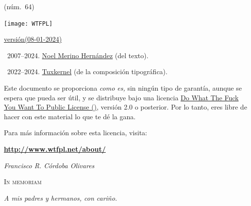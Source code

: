 \documentclass[14pt,twoside,final]{extbook} %
\providecommand\phantomsection{} %
\begin{document}
\begin{center}
(núm.\ 64)
\end{center}
\newpage
\pagestyle{empty}
\protect\phantomsection
{}
\vspace*{0pt}
\vfill
\begin{scriptsize}
\begin{flushleft}
\begin{minipage}{7.5cm}
\texttt{[image: WTFPL]}\phantomsection\label{fig:wtfpl} \protect\medskip

\def\fileversion{1.041}
\def\filedate{(08-01-2024)}
\href{https://tuxkernel.github.io/tx/dl/cv.txt}{versión\space\fileversion\space\filedate} \protect\medskip

\textcopyright\ 2007--2024. \href{noel_merino@yahoo.com.mx}{Noel Merino Hernández} (del texto).

\textcopyright\ 2022--2024. \href{muxkernel@gmail.com}{Tuxkernel} (de la composición tipográfica). \protect\medskip

Este documento se proporciona \emph{como es,} sin ningún tipo de garantía, aunque se espera que pueda ser útil, y se distribuye bajo una licencia \href{http://www.wtfpl.net/}{Do What The Fuck You Want To Public License ()}, versión 2.0 o posterior. Por lo tanto, eres libre de hacer con este material lo que te dé la  gana. \protect\medskip

Para más información sobre esta licencia, visita: \protect\medskip

\textbf{\url{http://www.wtfpl.net/about/}}
\end{minipage}
\end{flushleft}
\end{scriptsize}
\newpage
\pagestyle{empty}
\phantomsection
{}
\vspace*{48pt}
\begin{flushright}
\textit{Francisco R. Córdoba Olivares}
\end{flushright}
\begin{flushright}
\textsc{In memoriam}
\end{flushright}
\protect\smallskip
\begin{flushright}
\textit{A mis padres y hermanos, con cariño.}
\end{flushright}
\newpage
\pagestyle{empty}
\newpage
\pagestyle{empty}
\end{document}
